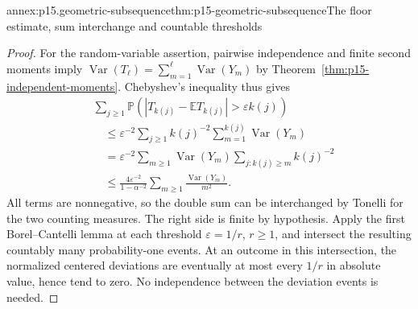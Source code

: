 \begin{annexitem}{annex:p15.geometric-subsequence}{thm:p15-geometric-subsequence}{The floor estimate, sum interchange and countable thresholds}
\begin{proof}
For the random-variable assertion, pairwise independence and finite
second moments imply
\(\operatorname{Var}(T_\ell)=\sum_{m=1}^\ell\operatorname{Var}(Y_m)\)
by Theorem~\ref{thm:p15-independent-moments}. Chebyshev's inequality
thus gives
\[
 \begin{aligned}
 &\sum_{j\geq1}\mathbb P\!\left(
     |T_{k(j)}-\mathbb ET_{k(j)}|>\varepsilon k(j)\right)\\
 &\quad\leq\varepsilon^{-2}\sum_{j\geq1}k(j)^{-2}
                        \sum_{m=1}^{k(j)}\operatorname{Var}(Y_m)\\
 &\quad=\varepsilon^{-2}\sum_{m\geq1}\operatorname{Var}(Y_m)
                               \sum_{j:k(j)\geq m}k(j)^{-2}\\
 &\quad\leq\frac{4\varepsilon^{-2}}{1-\alpha^{-2}}
                   \sum_{m\geq1}\frac{\operatorname{Var}(Y_m)}{m^2}.
 \end{aligned}
\]
All terms are nonnegative, so the double sum can be interchanged by
Tonelli for the two counting measures. The right side is finite by
hypothesis. Apply the first Borel--Cantelli lemma at each threshold
\(\varepsilon=1/r\), \(r\geq1\), and intersect the resulting
countably many probability-one events. At an outcome in this
intersection, the normalized centered deviations are eventually at
most every \(1/r\) in absolute value, hence tend to zero. No
independence between the deviation events is needed.
\end{proof}
\end{annexitem}

